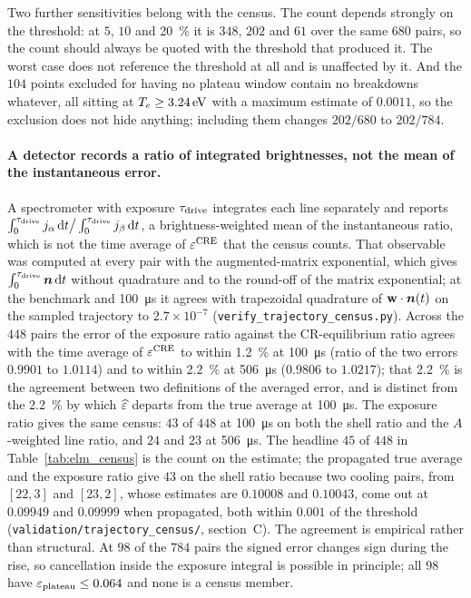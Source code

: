 Two further sensitivities belong with the census. The count depends strongly on
the threshold: at $5$, $10$ and \SI{20}{\percent} it is $348$, $202$ and $61$
over the same $680$ pairs, so the count should always be quoted with the
threshold that produced it. The worst case does not reference the threshold at
all and is unaffected by it. And the $104$ points excluded for having no plateau window
contain no breakdowns whatever, all sitting at $T_e\ge\SI{3.24}{\electronvolt}$
with a maximum estimate of $0.0011$, so the exclusion does not hide anything;
including them changes $202/680$ to $202/784$.

\paragraph{A detector records a ratio of integrated brightnesses, not the mean
of the instantaneous error.} A spectrometer with exposure $\tau_{\mathrm{drive}}$
integrates each line separately and reports
$\int_0^{\tau_{\mathrm{drive}}} j_\alpha\,\mathrm{d}t \big/ \int_0^{\tau_{\mathrm{drive}}} j_\beta\,\mathrm{d}t$,
a brightness-weighted mean of the instantaneous ratio, which is not the time
average of $\varepsilon^{\mathrm{CRE}}$ that the census counts. That observable was computed
at every pair with the augmented-matrix exponential, which gives
$\int_0^{\tau_{\mathrm{drive}}}\bm{n}\,\mathrm{d}t$ without quadrature and to the round-off
of the matrix exponential; at the benchmark and \SI{100}{\micro\second} it
agrees with trapezoidal quadrature of $\mathbf{w}\cdot\bm{n}(t)$ on the sampled
trajectory to $2.7\times10^{-7}$ (\texttt{verify\_trajectory\_census.py}).
Across the $448$ pairs the error of the exposure ratio against the
CR-equilibrium ratio agrees with the time average of $\varepsilon^{\mathrm{CRE}}$ to within
\SI{1.2}{\percent} at \SI{100}{\micro\second} (ratio of the two errors $0.9901$
to $1.0114$) and to within \SI{2.2}{\percent} at \SI{506}{\micro\second}
($0.9806$ to $1.0217$); that \SI{2.2}{\percent} is the agreement between two
definitions of the averaged error, and is distinct from the
\SI{2.2}{\percent} by which $\widehat{\varepsilon}$ departs from the true average at
\SI{100}{\micro\second}. The exposure ratio gives the same census: $43$ of $448$ at \SI{100}{\micro\second} on both the
shell ratio and the $A$-weighted line ratio, and $24$ and $23$ at
\SI{506}{\micro\second}. The headline $45$ of $448$ in
Table~\ref{tab:elm_census} is the count on the estimate; the propagated true
average and the exposure ratio give $43$ on the shell ratio because two
cooling pairs, from $[22,3]$ and $[23,2]$, whose estimates are $0.10008$ and
$0.10043$, come out at $0.09949$ and $0.09999$ when propagated, both within
$0.001$ of the threshold (\texttt{validation/trajectory\_census/},
section~C). The agreement is empirical rather than structural. At
$98$ of the $784$ pairs the signed error changes sign during the rise, so
cancellation inside the exposure integral is possible in principle; all $98$
have $\varepsilon_{\mathrm{plateau}}\le0.064$ and none is a census member.

